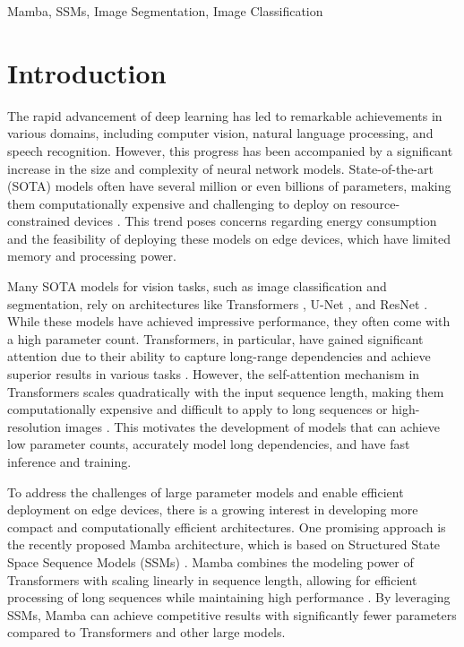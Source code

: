 \documentclass[conference]{IEEEtran}
\begin{document}
\begin{IEEEkeywords}
    Mamba, SSMs, Image Segmentation, Image Classification
\end{IEEEkeywords}

\section{Introduction}
The rapid advancement of deep learning has led to remarkable achievements in various domains, including computer vision, natural language processing, and speech recognition. However, this progress has been accompanied by a significant increase in the size and complexity of neural network models. State-of-the-art (SOTA) models often have several million or even billions of parameters, making them computationally expensive and challenging to deploy on resource-constrained devices \cite{naveed2024comprehensive}. This trend poses concerns regarding energy consumption and the feasibility of deploying these models on edge devices, which have limited memory and processing power.

Many SOTA models for vision tasks, such as image classification and segmentation, rely on architectures like Transformers \cite{dosovitskiy2021image}, U-Net \cite{ronneberger2015unet}, and ResNet \cite{he2015deep}. While these models have achieved impressive performance, they often come with a high parameter count. Transformers, in particular, have gained significant attention due to their ability to capture long-range dependencies and achieve superior results in various tasks \cite{vaswani2023attention}. However, the self-attention mechanism in Transformers scales quadratically with the input sequence length, making them computationally expensive and difficult to apply to long sequences or high-resolution images \cite{choromanski2022rethinking}. This motivates the development of models that can achieve low parameter counts, accurately model long dependencies, and have fast inference and training.

To address the challenges of large parameter models and enable efficient deployment on edge devices, there is a growing interest in developing more compact and computationally efficient architectures. One promising approach is the recently proposed Mamba architecture, which is based on Structured State Space Sequence Models (SSMs) \cite{gu2022efficiently}. Mamba combines the modeling power of Transformers with scaling linearly in sequence length, allowing for efficient processing of long sequences while maintaining high performance \cite{gu2023mamba}. By leveraging SSMs, Mamba can achieve competitive results with significantly fewer parameters compared to Transformers and other large models.
\end{document}

